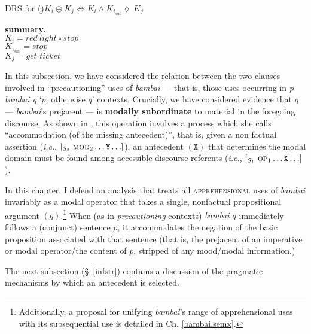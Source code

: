 \ex DRS for ()\hfill $\mathit{K_i\circleddash K_j\Leftrightarrow K_i\wedge K_{i_\text{sub}}\lozenge\ K_j}$



\footnotesize\it{}
\hfill\begin{minipage}[t]{.25\textwidth}
	\textbf{summary.}\\
	$ K_i =\mathit{red\ light\ \square\ stop}$\\
	$ K_{i_{\text{sub}}} = \textit{stop}$\\
	$ K_j = \textit{get ticket}$
\end{minipage}
\xe




In this subsection, we have considered the relation between the two clauses involved in ``precautioning'' uses of \textit{bambai} --- that is, those uses occurring in \textit{p bambai q} `$ p $, otherwise $ q $' contexts. Crucially, we have considered evidence that $ q $ --- \textit{bambai}'s prejacent --- is \textbf{modally subordinate} to material in the foregoing discourse. As shown in \citet[\S~2.2]{Roberts1989}, this operation involves a process which she calls ``accommodation (of the missing antecedent)'', that is, given a non factual assertion (\textit{i.e.}, $ [_{\mathit{S_2}}\ \textsc{mod}_2 \hdots\mathtt Y\hdots ] $), an antecedent $ \mathtt{(X)} $ that determines the modal domain must be found among accessible discourse referents (\textit{i.e.}, $ [_\mathit{S_1}\ \textsc{op}_1\hdots\mathtt{X}\hdots] $). 

In this chapter, I defend an analysis that treats all \textsc{apprehensional} uses of \textit{bambai} invariably as a modal operator that takes a single, nonfactual propositional argument $ (q) $.\footnote{Additionally, a proposal for unifying \textit{bambai}'s range of apprehensional uses with its subsequential use is detailed in Ch. \ref{bambai.semx}.} When (as in \textit{precautioning} contexts) \textit{bambai $ q $} immediately follows a (conjunct) sentence $ p $, it accommodates the negation of the basic proposition associated with that sentence (that is, the prejacent of an imperative or modal operator/the content of $ p $, stripped of any mood/modal information.)


The next subsection (\S~\ref{infstr}) contains a discussion of the pragmatic mechanisms by which an antecedent is selected.



